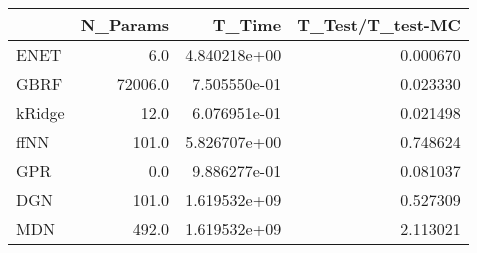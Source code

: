 \begin{tabular}{lrrr}
\toprule
{} &  N\_Params &        T\_Time &  T\_Test/T\_test-MC \\
\midrule
ENET   &       6.0 &  4.840218e+00 &          0.000670 \\
GBRF   &   72006.0 &  7.505550e-01 &          0.023330 \\
kRidge &      12.0 &  6.076951e-01 &          0.021498 \\
ffNN   &     101.0 &  5.826707e+00 &          0.748624 \\
GPR    &       0.0 &  9.886277e-01 &          0.081037 \\
DGN    &     101.0 &  1.619532e+09 &          0.527309 \\
MDN    &     492.0 &  1.619532e+09 &          2.113021 \\
\bottomrule
\end{tabular}
